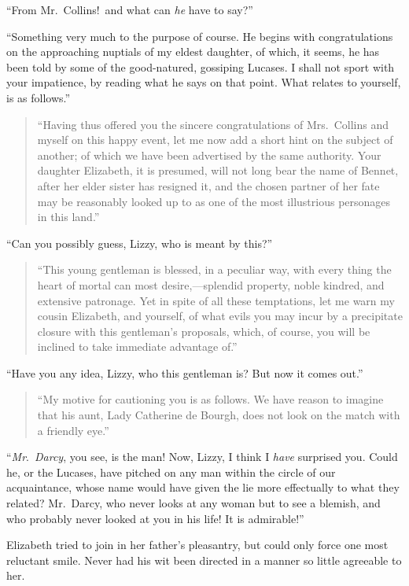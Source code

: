\documentclass[12pt,english]{book}
\begin{document}
{}``From Mr.\ Collins!\ and what can \textit{he} have to say?''

{}``Something very much to the purpose of course. He begins with
congratulations on the approaching nuptials of my eldest daughter,
of which, it seems, he has been told by some of the good-natured,
gossiping Lucases. I shall not sport with your impatience, by reading
what he says on that point. What relates to yourself, is as follows.''
\begin{quote}{}``Having thus offered you the sincere congratulations
of Mrs.\ Collins and myself on this happy event, let me now add a
short hint on the subject of another; of which we have been advertised
by the same authority. Your daughter Elizabeth, it is presumed, will
not long bear the name of Bennet, after her elder sister has resigned
it, and the chosen partner of her fate may be reasonably looked up
to as one of the most illustrious personages in this land.''\end{quote}

{}``Can you possibly guess, Lizzy, who is meant by this?''\begin{quote}{}``This
young gentleman is blessed, in a peculiar way, with every thing the
heart of mortal can most desire,\mbox{---}splendid property, noble
kindred, and extensive patronage. Yet in spite of all these temptations,
let me warn my cousin Elizabeth, and yourself, of what evils you may
incur by a precipitate closure with this gentleman's proposals, which,
of course, you will be inclined to take immediate advantage of.''\end{quote}

{}``Have you any idea, Lizzy, who this gentleman is? But now it comes
out.''

\begin{quote}{}``My motive for cautioning you is as follows. We
have reason to imagine that his aunt, Lady Catherine de Bourgh, does
not look on the match with a friendly eye.''\end{quote}

{}``\textit{Mr}.\ \textit{Darcy}, you see, is the man! Now, Lizzy,
I think I \textit{have} surprised you. Could he, or the Lucases, have
pitched on any man within the circle of our acquaintance, whose name
would have given the lie more effectually to what they related? Mr.\ Darcy,
who never looks at any woman but to see a blemish, and who probably
never looked at you in his life! It is admirable!''

Elizabeth tried to join in her father's pleasantry, but could only
force one most reluctant smile. Never had his wit been directed in
a manner so little agreeable to her.
\end{document}
